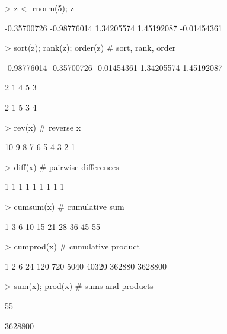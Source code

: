 \begin{Schunk}
\begin{Sinput}
> z <- rnorm(5); z
\end{Sinput}
\begin{Soutput}
[1] -0.35700726 -0.98776014  1.34205574  1.45192087 -0.01454361
\end{Soutput}
\begin{Sinput}
> sort(z); rank(z); order(z)              # sort, rank, order
\end{Sinput}
\begin{Soutput}
[1] -0.98776014 -0.35700726 -0.01454361  1.34205574  1.45192087
\end{Soutput}
\begin{Soutput}
[1] 2 1 4 5 3
\end{Soutput}
\begin{Soutput}
[1] 2 1 5 3 4
\end{Soutput}
\begin{Sinput}
> rev(x)                                  # reverse x
\end{Sinput}
\begin{Soutput}
 [1] 10  9  8  7  6  5  4  3  2  1
\end{Soutput}
\end{Schunk}

\begin{Schunk}
\begin{Sinput}
> diff(x)                                 # pairwise differences
\end{Sinput}
\begin{Soutput}
[1] 1 1 1 1 1 1 1 1 1
\end{Soutput}
\begin{Sinput}
> cumsum(x)                               # cumulative sum
\end{Sinput}
\begin{Soutput}
 [1]  1  3  6 10 15 21 28 36 45 55
\end{Soutput}
\begin{Sinput}
> cumprod(x)                              # cumulative product
\end{Sinput}
\begin{Soutput}
 [1]       1       2       6      24     120     720    5040   40320  362880 3628800
\end{Soutput}
\begin{Sinput}
> sum(x); prod(x)                         # sums and products
\end{Sinput}
\begin{Soutput}
[1] 55
\end{Soutput}
\begin{Soutput}
[1] 3628800
\end{Soutput}
\end{Schunk}
\label{r:sumprod}%

